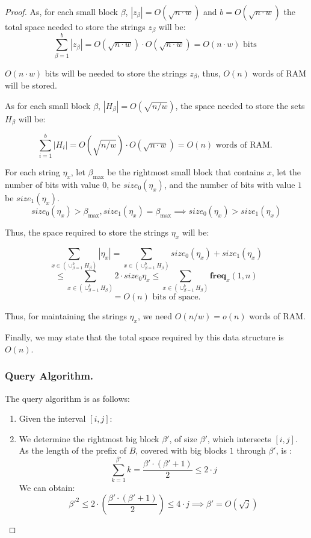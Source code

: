\documentclass[runningheads]{llncs}
\begin{document}
\begin{proof}
    As, for each small block $\beta$, $|z_{\beta}|=O(\sqrt{n\cdot w})$ and $b=O(\sqrt{n\cdot w})$  the total space needed to store the strings $z_{\beta}$ will be:
    \[
        \sum_{\beta=1}^{b} |z_{\beta}| = O(\sqrt{n\cdot w}) \cdot O(\sqrt{n\cdot w}) = O(n \cdot w) \text{ bits }
    \]

    $O(n\cdot w)$ bits will be needed to store the strings $z_{\beta}$, thus, $O(n)$ words of RAM will be stored.
    
    As for each small block $\beta$, $|H_{\beta}|=O(\sqrt{n/w})$, the space needed to store the sets $H_{\beta}$ will be:

    \[
        \sum_{i=1}^{b} | H_{i} | = O( \sqrt{n/w} ) \cdot O( \sqrt{n\cdot w} ) = O(n) \text{ words of RAM. }
    \]


    For each string $\eta_x$, let $\beta_{\text{max}}$ be the rightmost small block that contains $x$, let the number of bits with value $0$, be $size_0(\eta_x)$, and the number of bits with value $1$ be $size_1(\eta_x)$.
    \[
        size_0(\eta_x)>\beta_{\text{max}} , size_1(\eta_x)=\beta_{\text{max}} \implies size_0(\eta_x)>size_1(\eta_x)
    \]

    Thus, the space required to store the strings $\eta_x$ will be:

    \[
        \sum_{x \in ( \cup_{\beta=1}^{b}H_{\beta} ) } |\eta_x| = \sum_{x \in ( \cup_{\beta=1}^{b}H_{\beta} ) } size_0(\eta_x)+size_1(\eta_x)  
    \]
    \[
        \leq  \sum_{x \in ( \cup_{\beta=1}^{b}H_{\beta} ) } 2\cdot size_0{\eta_x} \leq  \sum_{x \in ( \cup_{\beta=1}^{b}H_{\beta} ) } \textbf{freq}_x(1,n)
    \]
    \[
        =O(n) \text{ bits of space.}
    \]

    Thus, for maintaining the strings $\eta_x$, we need $O(n/w)=o(n)$ words of RAM.

    Finally, we may state that the total space required by this data structure is $O(n)$.

    \subsubsection{Query Algorithm.} The  query algorithm is as follows:
    \begin{enumerate}
        \item[] Given the interval $[i,j]$: 
        
        \item We determine the rightmost big block $\beta'$, of size $\beta'$, which intersects $[i,j]$. As the length of the prefix of $B$, covered with big blocks $1$ through $\beta'$, is :
            \[
             \sum_{k=1}^{\beta'}k=\frac{\beta'\cdot(\beta'+1)}{2} \leq 2 \cdot j 
            \] 
            We can obtain:
            \[
                \beta'^2 \leq 2\cdot ( \frac{\beta'\cdot(\beta'+1)}{2} ) \leq 4\cdot j \implies \beta' = O(\sqrt{j}) 
            \]


\end{enumerate}
\end{proof}
\end{document}
